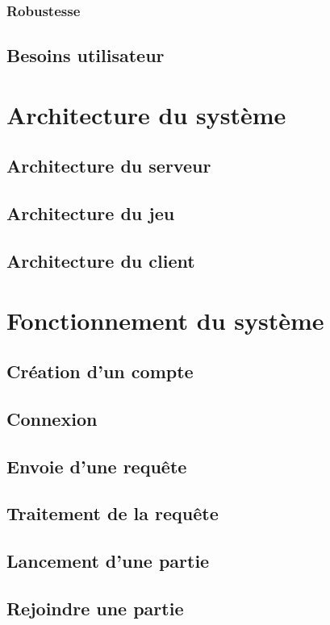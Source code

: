 \documentclass{article}
\begin{document}
\subsubsection{Robustesse}

\subsection{Besoins utilisateur}

\section{Architecture du système}

\subsection{Architecture du serveur}

\subsection{Architecture du jeu}

\subsection{Architecture du client}

\section{Fonctionnement du système}

\subsection{Création d'un compte}

\subsection{Connexion}

\subsection{Envoie d'une requête}

\subsection{Traitement de la requête}

\subsection{Lancement d'une partie}

\subsection{Rejoindre une partie} 
\end{document}
